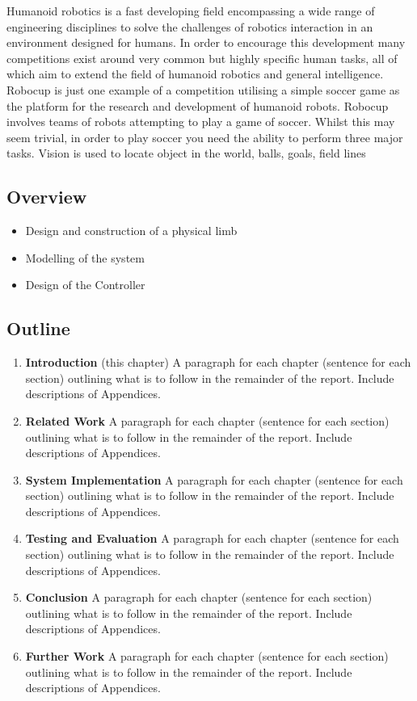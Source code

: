 \documentclass[11pt,a4paper]{article}
\begin{document}
Humanoid robotics is a fast developing field encompassing a wide range of engineering disciplines to solve the challenges of robotics interaction in an environment designed for humans. In order to encourage this development many competitions exist around very common but highly specific human tasks, all of which aim to extend the field of humanoid robotics and general intelligence. Robocup is just one example of a competition utilising a simple soccer game as the platform for the research and development of humanoid robots. Robocup involves teams of robots attempting to play a game of soccer. Whilst this may seem trivial, in order to play soccer you need the ability to perform three major tasks. Vision is used to locate object in the world, balls, goals, field lines

\subsection{Overview}
\label{sub:overview}
\begin{itemize}
\item Design and construction of a physical limb
\item Modelling of the system
\item Design of the Controller
\end{itemize}

\newpage
\subsection{Outline}
\label{sub:outline}
\begin{enumerate}
\item \textbf{Introduction} (this chapter) A paragraph for each chapter (sentence for each section) outlining what is to follow in the 
remainder of the report. Include descriptions of Appendices.
\item \textbf{Related Work} A paragraph for each chapter (sentence for each section) outlining what is to follow in the
remainder of the report. Include descriptions of Appendices.
\item \textbf{System Implementation} A paragraph for each chapter (sentence for each section) outlining what is to follow in the
remainder of the report. Include descriptions of Appendices.
\item \textbf{Testing and Evaluation} A paragraph for each chapter (sentence for each section) outlining what is to follow in the
remainder of the report. Include descriptions of Appendices.
\item \textbf{Conclusion} A paragraph for each chapter (sentence for each section) outlining what is to follow in the
remainder of the report. Include descriptions of Appendices.
\item \textbf{Further Work} A paragraph for each chapter (sentence for each section) outlining what is to follow in the
remainder of the report. Include descriptions of Appendices.
\end{enumerate}
\end{document}
